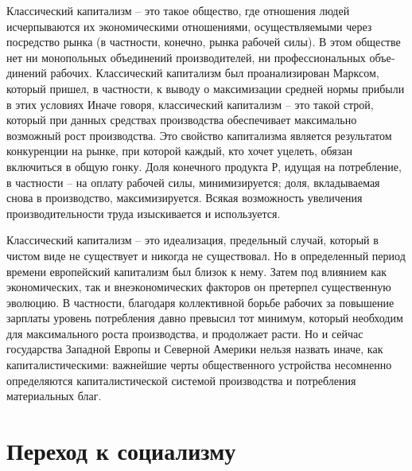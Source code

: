 \documentclass{book}
\begin{document}
Классический капитализм -- это такое общество, где отно­шения людей исчерпываются  их экономическими отношениями, осуществляемыми через посредство рынка (в частности, конеч­но, рынка рабочей силы). В этом обществе нет ни монополь­ных объединений производителей, ни профессиональных объе­динений рабочих. Классический капитализм был проанализи­рован Марксом, который пришел, в частности, к выводу о мак­симизации средней нормы прибыли в этих условиях Иначе го­воря, классический капитализм -- это такой строй, который при данных средствах производства обеспечивает максималь­но возможный рост производства. Это свойство капитализма является результатом конкуренции на рынке, при которой каж­дый, кто хочет уцелеть, обязан включиться в общую гонку. Доля конечного продукта Р, идущая на потребление, в част­ности -- на оплату рабочей силы, минимизируется; доля, вкла­дываемая снова в производство, максимизируется. Всякая воз­можность увеличения производительности труда изыскивает­ся и используется.

Классический капитализм -- это идеализация, предельный случай, который в чистом виде не существует и никогда не су­ществовал. Но в определенный период времени европейский капитализм был близок к нему. Затем под влиянием как эко­номических, так и внеэкономических факторов он претерпел существенную эволюцию. В частности, благодаря коллективной борьбе рабочих за повышение зарплаты уровень потребления давно превысил тот минимум, который необходим для макси­мального роста производства, и продолжает расти. Но и сейчас государства Западной Европы и Северной Америки нельзя наз­вать иначе, как капиталистическими: важнейшие черты общест­венного устройства несомненно определяются капиталистиче­ской системой производства и потребления материальных благ.



\section{Переход к социализму}
\end{document}

